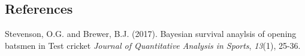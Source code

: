 \documentclass[12pt]{article}
\begin{document}
%        
%
%        

\subsection*{References}

\begin{description}

\item
Stevenson, O.G. and Brewer, B.J. (2017).
Bayesian survival anaylsis of opening batsmen in Test cricket
\textit{Journal of Quantitative Analysis in Sports}, \textit{13}(1), 25-36.

\end{description}
\end{document}
